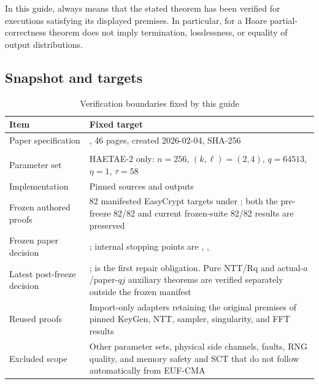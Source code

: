 \begin{boundary}
In this guide, \statusproved always means that the stated theorem has been
verified for executions satisfying its displayed premises. In particular,
\statusproved for a Hoare partial-correctness theorem does not imply
termination, losslessness, or equality of output distributions.
\end{boundary}

\subsection{Snapshot and targets}

\begin{table}[ht]
\centering
\caption{Verification boundaries fixed by this guide}
\label{tab:snapshot}
\begin{tabularx}{\textwidth}{L{0.27\textwidth}Y}
\toprule
Item & Fixed target \\
\midrule
Paper specification & , 46 pages, created 2026-02-04,
SHA-256 \\
& \newline
{}
\cite{haetae-spec} \\
Parameter set & HAETAE-2 only: \(n=256\), \((k,\ell)=(2,4)\),
\(q=64513\), \(\eta=1\), \(\tau=58\) \\
Implementation & Pinned  sources and
 outputs \cite{haetae-jasmin} \\
Frozen authored proofs & 82 manifested EasyCrypt targets under
; both the pre-freeze 82/82 and
current frozen-suite 82/82 results are preserved \\
Frozen paper decision & ; internal stopping points are
, ,
 \\
Latest post-freeze decision & ;
 is the first repair obligation.
Pure NTT/Rq and actual-\(a\)/paper-\(qj\) auxiliary theorems are verified
separately outside the frozen manifest \\
Reused proofs & Import-only adapters retaining the original premises of pinned
KeyGen, NTT, sampler, singularity, and FFT results \cite{haetae-easycrypt} \\
Excluded scope & Other parameter sets, physical side channels, faults, RNG
quality, and memory safety and SCT that do not follow automatically from EUF-CMA \\
\bottomrule
\end{tabularx}
\end{table}

